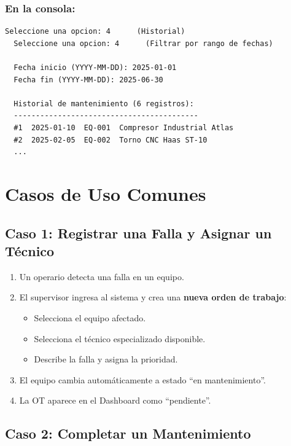\documentclass[12pt, a4paper]{article}
\begin{document}
\subsubsection{En la consola:}
\begin{lstlisting}[style=console]
  Seleccione una opcion: 4      (Historial)
  Seleccione una opcion: 4      (Filtrar por rango de fechas)

  Fecha inicio (YYYY-MM-DD): 2025-01-01
  Fecha fin (YYYY-MM-DD): 2025-06-30

  Historial de mantenimiento (6 registros):
  ------------------------------------------
  #1  2025-01-10  EQ-001  Compresor Industrial Atlas
  #2  2025-02-05  EQ-002  Torno CNC Haas ST-10
  ...
\end{lstlisting}

\newpage
\section{Casos de Uso Comunes}

\subsection{Caso 1: Registrar una Falla y Asignar un T\'ecnico}

\begin{enumerate}[leftmargin=2em]
    \item Un operario detecta una falla en un equipo.
    \item El supervisor ingresa al sistema y crea una \textbf{nueva orden de trabajo}:
    \begin{itemize}
        \item Selecciona el equipo afectado.
        \item Selecciona el t\'ecnico especializado disponible.
        \item Describe la falla y asigna la prioridad.
    \end{itemize}
    \item El equipo cambia autom\'aticamente a estado ``en mantenimiento''.
    \item La OT aparece en el Dashboard como ``pendiente''.
\end{enumerate}

\subsection{Caso 2: Completar un Mantenimiento}
\end{document}
